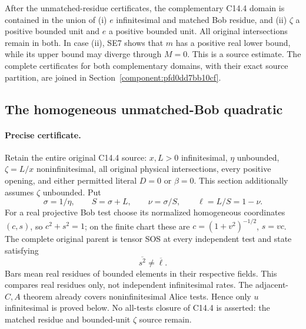 After the unmatched-residue certificates, the complementary C14.4 domain is contained in the union of (i) $e$ infinitesimal and matched Bob residue, and (ii) $\zeta$ a positive bounded unit and $e$ a positive bounded unit. All original intersections remain in both. In case (ii), SE7 shows that $m$ has a positive real lower bound, while its upper bound may diverge through $M=0$. This is a source estimate. The complete certificates for both complementary domains, with their exact source partition, are joined in Section~\ref{component:pfd0dd7bb10cf}.



\subsection{The homogeneous unmatched-Bob quadratic}

\label{component:p1a6cc124f5db}

\label{p1a6cc124f5db:sec:r18-c144-bob-residue}

\paragraph{Precise certificate.}
Retain the entire original C14.4 source: $x,L>0$ infinitesimal,
$\eta$ unbounded, $\zeta=L/x$ noninfinitesimal, all original physical
intersections, every positive opening, and either permitted literal
$D=0$ or $\beta=0$. This section additionally assumes $\zeta$
unbounded. Put
\[
 \sigma=1/\eta,\qquad S=\sigma+L,\qquad
 \nu=\sigma/S,\qquad \ell=L/S=1-\nu.
\]
For a real projective Bob test choose its normalized homogeneous
coordinates $(c,s)$, so $c^2+s^2=1$; on the finite chart these are
$c=(1+v^2)^{-1/2}$, $s=vc$. The complete original parent is tensor SOS
at every independent test and state satisfying
\[
                         \overline{s^2}\ne\overline\ell.       \tag{EB1}
\]
Bars mean real residues of bounded elements in their respective fields.
This compares real residues only, not independent infinitesimal rates.
The adjacent-$C,A$ theorem already covers noninfinitesimal Alice
tests. Hence only $u$ infinitesimal is proved below. No all-tests
closure of C14.4 is asserted: the matched residue and bounded-unit
$\zeta$ source remain.


